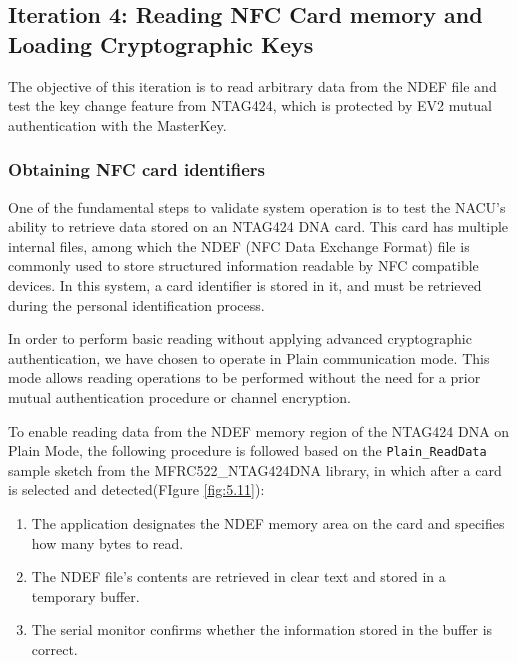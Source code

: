 \subsection{Iteration 4: Reading NFC Card memory and Loading Cryptographic Keys}

The objective of this iteration is to read arbitrary data from the NDEF file and test the key change feature from NTAG424, which is protected by EV2 mutual authentication with the MasterKey.

\subsubsection{Obtaining NFC card identifiers}

One of the fundamental steps to validate system operation is to test the NACU's ability to retrieve data stored on an NTAG424 DNA card. This card has multiple internal files, among which the NDEF (NFC Data Exchange Format) file is commonly used to store structured information readable by NFC compatible devices. In this system, a card identifier is stored in it, and must be retrieved during the personal identification process.

In order to perform basic reading without applying advanced cryptographic authentication, we have chosen to operate in Plain communication mode. This mode allows reading operations to be performed without the need for a prior mutual authentication procedure or channel encryption.

To enable reading data from the NDEF memory region of the NTAG424 DNA on Plain Mode, the following procedure is followed based on the \texttt{Plain\_ReadData} sample sketch from the MFRC522\_NTAG424DNA library, in which after a card is selected and detected(FIgure \ref{fig:5.11}):
\begin{enumerate}
	\item The application designates the NDEF memory area on the card and specifies how many bytes to read.
	\item The NDEF file’s contents are retrieved in clear text and stored in a temporary buffer.
	\item The serial monitor confirms whether the information stored in the buffer is correct.
\end{enumerate}


